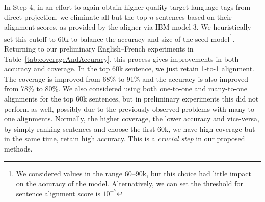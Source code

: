 In Step 4, in an effort to again obtain higher quality target language
tags from direct projection, we eliminate all but the top $n$
sentences based on their alignment scores, as provided by the aligner
via IBM model 3.
We heuristically set this cutoff to 60k to balance the accuracy and size of the seed model\footnote{We considered values in the range 60--90k, but this choice had little impact on the accuracy of the model. Alternatively, we can set the threshold for sentence alignment score is $10^{-7}$}.
Returning to our preliminary English--French experiments in
Table~\ref{tab:coverageAndAccuracy}, this process gives improvements
in both accuracy and coverage. In the top 60k sentence, we just retain 1-to-1 alignment. The coverage is improved from 68\% to 91\% and the accuracy is also improved from 78\% to 80\%. We also considered using both one-to-one and many-to-one alignments for the top 60k sentences, but in preliminary experiments this did not perform as  well, possibly due to the previously-observed problems with many-to-one alignments. Normally, the higher coverage, the lower accuracy and vice-versa, by simply ranking sentences and choose the first 60k, we have high coverage but in the same time, retain high accuracy. This is a \textit{crucial step} in our proposed methods. 
  
